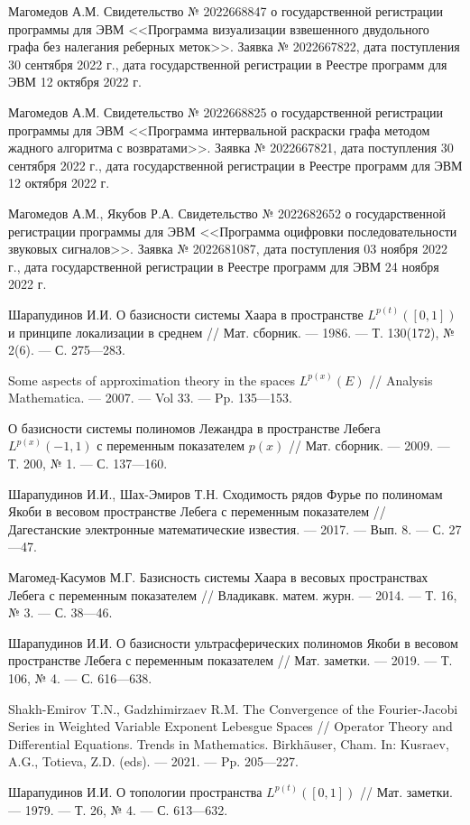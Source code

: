 \begin{thebibliography}{111}
Магомедов А.М.
Свидетельство № 2022668847 о государственной регистрации программы для ЭВМ <<Программа визуализации взвешенного двудольного графа без налегания реберных меток>>. Заявка № 2022667822, дата поступления 30 сентября 2022 г., дата государственной регистрации в Реестре программ для ЭВМ 12 октября 2022 г.

Магомедов А.М.
Свидетельство № 2022668825 о государственной регистрации программы для ЭВМ <<Программа интервальной раскраски графа методом жадного алгоритма с возвратами>>.
Заявка № 2022667821, дата поступления 30 сентября 2022 г., дата государственной регистрации в Реестре программ для ЭВМ 12 октября 2022 г.

Магомедов А.М., Якубов Р.А.
Свидетельство № 2022682652 о государственной регистрации программы для ЭВМ <<Программа оцифровки последовательности звуковых сигналов>>.
Заявка № 2022681087, дата поступления 03 ноября 2022 г., дата государственной регистрации в Реестре программ для ЭВМ 24 ноября 2022 г.



Шарапудинов И.И.
О базисности системы Хаара в пространстве $L^{p(t)}([0,1])$ и принципе локализации в среднем
//
Мат. сборник.
--- 1986.
--- Т. 130(172), № 2(6).
--- С. 275---283.

Some aspects of approximation theory in the spaces $L^{p(x)}(E)$
//
Analysis Mathematica.
--- 2007.
--- Vol 33.
--- Pp. 135---153.

О базисности системы полиномов Лежандра в пространстве Лебега $L^{p(x)}(-1,1)$ с переменным показателем $p(x)$
//
Мат. сборник.
--- 2009.
--- Т. 200, № 1.
--- С. 137---160.

Шарапудинов И.И., Шах-Эмиров Т.Н.
Сходимость рядов Фурье по полиномам Якоби в весовом пространстве Лебега с переменным показателем
//
Дагестанские электронные математические известия.
--- 2017.
--- Вып. 8.
--- С. 27---47.

Магомед-Касумов М.Г.
Базисность системы Хаара в весовых пространствах Лебега с переменным показателем
//
Владикавк. матем. журн.
--- 2014.
--- Т. 16, № 3.
--- С. 38---46.

Шарапудинов И.И.
О базисности ультрасферических полиномов Якоби в весовом пространстве Лебега с переменным показателем
//
Мат. заметки.
--- 2019.
--- Т. 106, № 4.
--- С. 616---638.

Shakh-Emirov T.N., Gadzhimirzaev R.M.
The Convergence of the Fourier-Jacobi Series in Weighted Variable Exponent Lebesgue Spaces
//
Operator Theory and Differential Equations. Trends in Mathematics. Birkhäuser, Cham.  In: Kusraev, A.G., Totieva, Z.D. (eds).
--- 2021.
--- Pp. 205---227.

Шарапудинов И.И.
О топологии пространства $L^{p(t)}([0,1])$
//
Мат. заметки.
--- 1979.
--- Т. 26, № 4.
--- С. 613---632.

\end{thebibliography} 